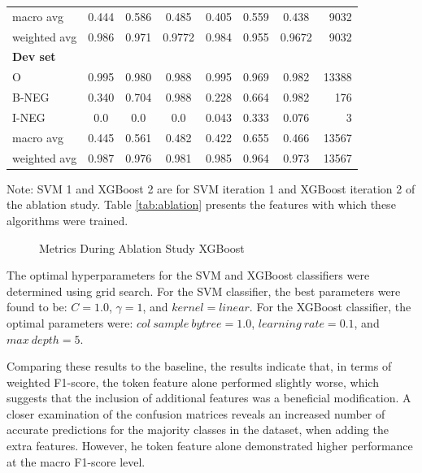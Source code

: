 \begin{table}[!ht]
\begin{tabular}{lccc|cccr}
macro avg          &  0.444 &  0.586 &  0.485 & 0.405 & 0.559 & 0.438 & 9032 \\
weighted avg       &  0.986 &  0.971 &  0.9772 & 0.984 & 0.955 & 0.9672 & 9032 \\
\hline
\textbf{Dev set}   &        &        &        &       &       & &   \\
O                  &  0.995 &  0.980 &  0.988 & 0.995 & 0.969 & 0.982 & 13388 \\
B-NEG              &  0.340 &  0.704 &  0.988 & 0.228 & 0.664 & 0.982 & 176 \\
I-NEG              &  0.0   &  0.0   &  0.0   & 0.043 & 0.333 & 0.076 & 3 \\
macro avg          &  0.445 &  0.561 &  0.482 & 0.422 & 0.655 & 0.466 & 13567 \\
weighted avg       &  0.987 &  0.976 &  0.981 & 0.985 & 0.964 & 0.973 & 13567 \\
\hline
\end{tabular}
\small

{Note:} SVM 1 and XGBoost 2 are for SVM iteration 1 and XGBoost iteration 2 of the ablation study. Table \ref{tab:ablation} presents the features with which these algorithms were trained.
\end{table}



\begin{figure}[!ht]
\centering
  \caption{Metrics During Ablation Study XGBoost}
  \label{fig:metrics_xgb_training}
\end{figure}

The optimal hyperparameters for the SVM and XGBoost classifiers were determined using grid search. For the SVM classifier, the best parameters were found to be: $ C = 1.0 $, $ \gamma = 1 $, and $ kernel = linear $.  For the XGBoost classifier, the optimal parameters were: $col \ sample \ bytree= 1.0$, $learning \ rate = 0.1$, and $max \ depth = 5$.

Comparing these results to the baseline, the results indicate that, in terms of weighted F1-score, the token feature alone performed slightly worse, which suggests that the inclusion of additional features was a beneficial modification. A closer examination of the confusion matrices reveals an increased number of accurate predictions for the majority classes in the dataset, when adding the extra features. However, he token feature alone demonstrated higher performance at the macro F1-score level.